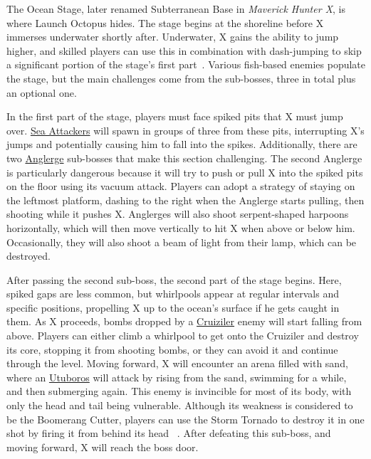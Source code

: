 The Ocean Stage, later renamed Subterranean Base in \textit{Maverick Hunter X}, is where Launch Octopus hides. The stage begins at the shoreline before X immerses underwater shortly after. Underwater, X gains the ability to jump higher, and skilled players can use this in combination with dash-jumping to skip a significant portion of the stage's first part~\cite{stratwiki:Ocean}. Various fish-based enemies populate the stage, but the main challenges come from the sub-bosses, three in total plus an optional one.

In the first part of the stage, players must face spiked pits that X must jump over. \hyperlink{enem:Sea_Attacker}{Sea Attackers} will spawn in groups of three from these pits, interrupting X's jumps and potentially causing him to fall into the spikes. Additionally, there are two \hyperlink{miniboss:Anglerge}{Anglerge} sub-bosses that make this section challenging. The second Anglerge is particularly dangerous because it will try to push or pull X into the spiked pits on the floor using its vacuum attack. Players can adopt a strategy of staying on the leftmost platform, dashing to the right when the Anglerge starts pulling, then shooting while it pushes X. Anglerges will also shoot serpent-shaped harpoons horizontally, which will then move vertically to hit X when above or below him. Occasionally, they will also shoot a beam of light from their lamp, which can be destroyed.

After passing the second sub-boss, the second part of the stage begins. Here, spiked gaps are less common, but whirlpools appear at regular intervals and specific positions, propelling X up to the ocean's surface if he gets caught in them. As X proceeds, bombs dropped by a \hyperlink{miniboss:Cruiziler}{Cruiziler} enemy will start falling from above. Players can either climb a whirlpool to get onto the Cruiziler and destroy its core, stopping it from shooting bombs, or they can avoid it and continue through the level. Moving forward, X will encounter an arena filled with sand, where an \hyperlink{miniboss:Utuboros}{Utuboros} will attack by rising from the sand, swimming for a while, and then submerging again. This enemy is invincible for most of its body, with only the head and tail being vulnerable. Although its weakness is considered to be the Boomerang Cutter, players can use the Storm Tornado to destroy it in one shot by firing it from behind its head ~\cite{wiki:Utuboros}. After defeating this sub-boss, and moving forward, X will reach the boss door.

